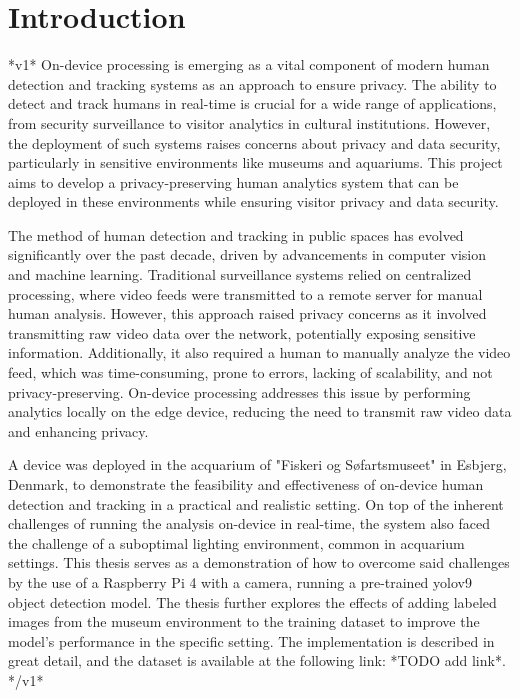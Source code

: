 \section{Introduction} 
*v1* On-device processing is emerging as a vital component of modern human detection and tracking systems as an approach to ensure privacy. The ability to detect and track humans in real-time is crucial for a wide range of applications, from security surveillance to visitor analytics in cultural institutions. However, the deployment of such systems raises concerns about privacy and data security, particularly in sensitive environments like museums and aquariums. This project aims to develop a privacy-preserving human analytics system that can be deployed in these environments while ensuring visitor privacy and data security.

The method of human detection and tracking in public spaces has evolved significantly over the past decade, driven by advancements in computer vision and machine learning. Traditional surveillance systems relied on centralized processing, where video feeds were transmitted to a remote server for manual human analysis. However, this approach raised privacy concerns as it involved transmitting raw video data over the network, potentially exposing sensitive information. Additionally, it also required a human to manually analyze the video feed, which was time-consuming, prone to errors, lacking of scalability, and not privacy-preserving. On-device processing addresses this issue by performing analytics locally on the edge device, reducing the need to transmit raw video data and enhancing privacy.  

A device was deployed in the acquarium of "Fiskeri og Søfartsmuseet" in Esbjerg, Denmark, to demonstrate the feasibility and effectiveness of on-device human detection and tracking in a practical and realistic setting. On top of the inherent challenges of running the analysis on-device in real-time, the system also faced the challenge of a suboptimal lighting environment, common in acquarium settings. This thesis serves as a demonstration of how to overcome said challenges by the use of a Raspberry Pi 4 with a camera, running a pre-trained yolov9 object detection model. The thesis further explores the effects of adding labeled images from the museum environment to the training dataset to improve the model's performance in the specific setting. The implementation is described in great detail, and the dataset is available at the following link: *TODO add link*. */v1*

